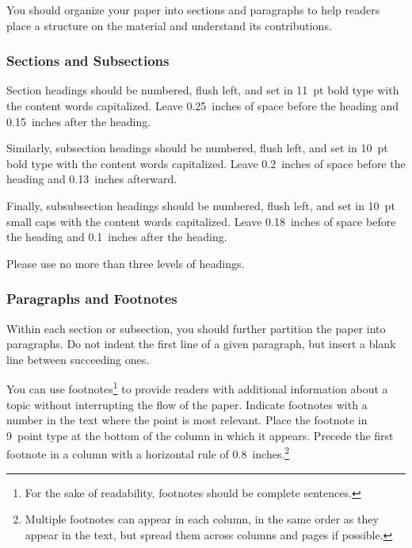 \documentclass{article}
\begin{document}
You should organize your paper into sections and paragraphs to help
readers place a structure on the material and understand its
contributions.

\subsubsection{Sections and Subsections}

Section headings should be numbered, flush left, and set in 11~pt bold
type with the content words capitalized. Leave 0.25~inches of space
before the heading and 0.15~inches after the heading.

Similarly, subsection headings should be numbered, flush left, and set
in 10~pt bold type with the content words capitalized. Leave
0.2~inches of space before the heading and 0.13~inches afterward.

Finally, subsubsection headings should be numbered, flush left, and
set in 10~pt small caps with the content words capitalized. Leave
0.18~inches of space before the heading and 0.1~inches after the
heading. 

Please use no more than three levels of headings.

\subsubsection{Paragraphs and Footnotes}

Within each section or subsection, you should further partition the
paper into paragraphs. Do not indent the first line of a given
paragraph, but insert a blank line between succeeding ones.
 
You can use footnotes\footnote{For the sake of readability, footnotes
should be complete sentences.} to provide readers with additional
information about a topic without interrupting the flow of the paper. 
Indicate footnotes with a number in the text where the point is most
relevant. Place the footnote in 9~point type at the bottom of the
column in which it appears. Precede the first footnote in a column
with a horizontal rule of 0.8~inches.\footnote{Multiple footnotes can
appear in each column, in the same order as they appear in the text,
but spread them across columns and pages if possible.}
\end{document}
